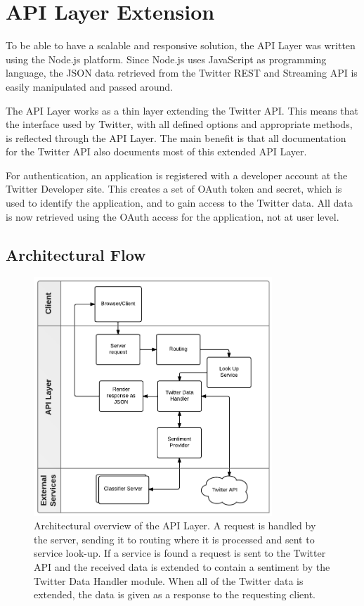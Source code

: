 \section{API Layer Extension}

To be able to have a scalable and responsive solution, the API Layer was written using the Node.js platform. Since Node.js uses JavaScript as programming language, the JSON data retrieved from the Twitter REST and Streaming API is easily manipulated and passed around. 

The API Layer works as a thin layer extending the Twitter API. This means that the interface used by Twitter, with all defined options and appropriate methods, is reflected through the API Layer. The main benefit is that all documentation for the Twitter API also documents most of this extended API Layer.

For authentication, an application is registered with a developer account at the Twitter Developer site. This creates a set of OAuth token and secret, which is used to identify the application, and to gain access to the Twitter data. All data is now retrieved using the OAuth access for the application, not at user level. 

\subsection{Architectural Flow}


\begin{figure}[htb]
 \begin{center}
     \includegraphics[width=0.8\textwidth]{./figs/APILayerArcitechture.pdf}
 \end{center}
 \caption[Architectural overview of the API Layer.]{Architectural overview of the API Layer. A request is handled by the server, sending it to routing where it is processed and sent to service look-up. If a service is found a request is sent to the Twitter API and the received data is extended to contain a sentiment by the Twitter Data Handler module. When all of the Twitter data is extended, the data is given as a response to the requesting client.}
 \label{fig:APILayerArcitechture.pdf}
\end{figure}

